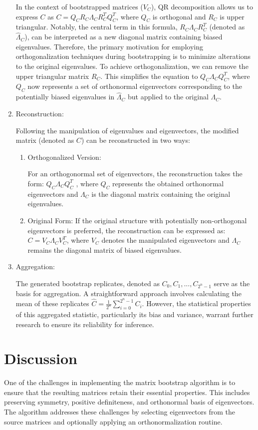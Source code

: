 \documentclass{article}
\begin{document}
\begin{enumerate}
In the context of bootstrapped matrices ($V_C$), QR decomposition allows us to express $C$ as $C = Q_C R_C \Lambda_C R_C^T Q_C^T$, where $Q_C$ is orthogonal and $R_C$ is upper triangular. Notably, the central term in this formula, $R_C \Lambda_C R_C^T$ (denoted as $\hat{\Lambda}_C$), can be interpreted as a new diagonal matrix containing biased eigenvalues. Therefore, the primary motivation for employing orthogonalization techniques during bootstrapping is to minimize alterations to the original eigenvalues. To achieve orthogonalization, we can remove the upper triangular matrix $R_C$. This simplifies the equation to $Q_C \Lambda_C Q_C^T$, where $Q_C$ now represents a set of orthonormal eigenvectors corresponding to the potentially biased eigenvalues in $\hat{\Lambda}_C$ but applied to the original $\Lambda_C$.

\item Reconstruction:

Following the manipulation of eigenvalues and eigenvectors, the modified matrix (denoted as $C$) can be reconstructed in two ways:
\begin{enumerate} 
\item Orthogonalized Version: 

For an orthogonormal set of eigenvectors, the reconstruction takes the form: $Q_C \Lambda_C Q_C^T$ , where $Q_C$ represents the obtained orthonormal eigenvectors and $\Lambda_C$ is the diagonal matrix containing the original eigenvalues.

\item Original Form: 
If the original structure with potentially non-orthogonal eigenvectors is preferred, the reconstruction can be expressed as: $C = V_C \Lambda_C V_C^T$, where $V_C$ denotes the manipulated eigenvectors and $\Lambda_C$ remains the diagonal matrix of biased eigenvalues.

\end{enumerate}

\item Aggregation:

The generated bootstrap replicates, denoted as $C_0, C_1,..., C_{2^n-1}$ serve as the basis for aggregation. A straightforward approach involves calculating the mean of these replicates $\hat{C} = \frac{1}{2^n} \sum_{i=0}^{2^n-1}{C_i}$. However, the statistical properties of this aggregated statistic, particularly its bias and variance, warrant further research to ensure its reliability for inference.

\end{enumerate}

\section{Discussion}

One of the challenges in implementing the matrix bootstrap algorithm is to ensure that the resulting matrices retain their essential properties. This includes preserving symmetry, positive definiteness, and orthonormal basis of eigenvectors. The algorithm addresses these challenges by selecting eigenvectors from the source matrices and optionally applying an orthonormalization routine. 
\end{document}

